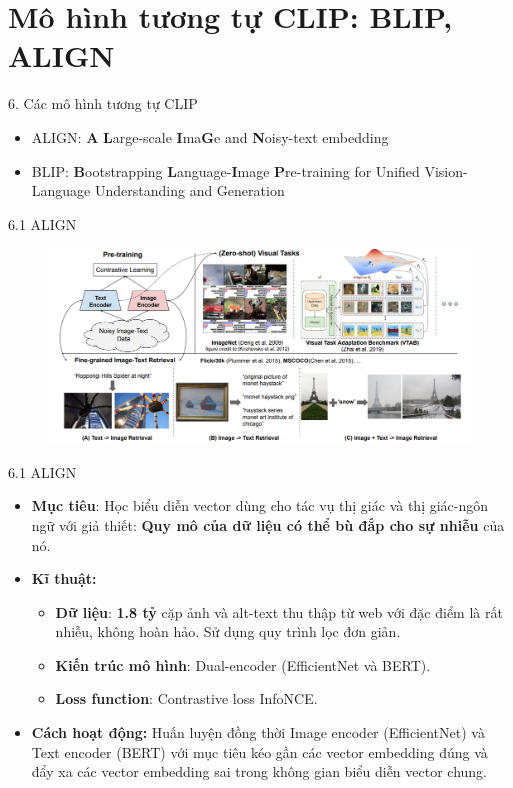 \section{Mô hình tương tự CLIP: BLIP, ALIGN}
\begin{frame}{6. Các mô hình tương tự CLIP}
\begin{itemize}
    \item ALIGN: \textbf{A} \textbf{L}arge-scale \textbf{I}ma\textbf{G}e and
\textbf{N}oisy-text embedding
    \item BLIP: \textbf{B}ootstrapping \textbf{L}anguage-\textbf{I}mage \textbf{P}re-training for
Unified Vision-Language Understanding and Generation
\end{itemize}
\end{frame}

\begin{frame}{6.1 ALIGN}
\begin{figure}
    \centering
    \includegraphics[width=1\linewidth]{img/06-ALIGN.png}
\end{figure}
\end{frame}

\begin{frame}{6.1 ALIGN}
    \begin{itemize}
        \item \textbf{Mục tiêu}: Học biểu diễn vector dùng cho tác vụ thị giác và thị giác-ngôn ngữ với giả thiết: \textbf{Quy mô của dữ liệu có thể bù đắp cho sự nhiễu} của nó.
        \item \textbf{Kĩ thuật:} 
        \begin{itemize}
            \item \textbf{Dữ liệu}: \textbf{1.8 tỷ} cặp ảnh và alt-text thu thập từ web với đặc điểm là rất nhiễu, không hoàn hảo. Sử dụng quy trình lọc đơn giản.
            \item \textbf{Kiến trúc mô hình}: Dual-encoder (EfficientNet và BERT).
            \item \textbf{Loss function}: Contrastive loss InfoNCE.
        \end{itemize}
        \item \textbf{Cách hoạt động:} Huấn luyện đồng thời Image encoder (EfficientNet) và Text encoder (BERT) với mục tiêu kéo gần các vector embedding đúng và đẩy xa các vector embedding sai trong không gian biểu diễn vector chung. 
    \end{itemize}
\end{frame}

